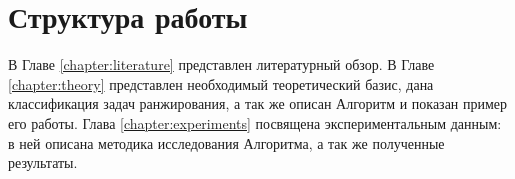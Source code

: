 \section*{Структура работы}
В Главе \ref{chapter:literature} представлен литературный обзор. В Главе \ref{chapter:theory} представлен необходимый теоретический базис, дана классификация задач ранжирования, а так же описан Алгоритм и показан пример его работы. Глава \ref{chapter:experiments} посвящена экспериментальным данным: в ней описана методика исследования Алгоритма, а так же полученные результаты.